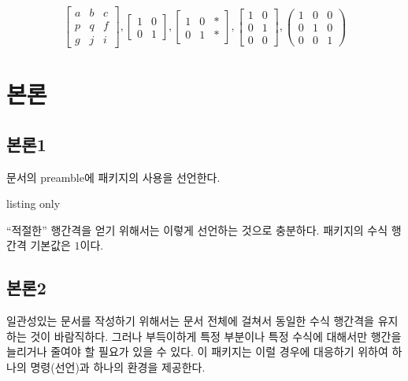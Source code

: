 \documentclass[a4paper,amsmath]{oblivoir}
\begin{document}
\begin{obMathLeading}
    \[
        \begin{bmatrix} a & b & c \\ p & q & f \\ g & j & i \end{bmatrix},
        \begin{bmatrix} 1 & 0 \\ 0 & 1\end{bmatrix},
        \begin{bmatrix} 1 & 0 & \ast\! \\ 0 & 1 & \ast\! \end{bmatrix},
        \begin{bmatrix} 1 & 0 \\ 0 & 1 \\ 0 & 0 \end{bmatrix},
        \begin{pmatrix} 1 & 0 & 0 \\ 0 & 1 & 0 \\ 0 & 0 & 1 \end{pmatrix}
    \]
\end{obMathLeading}

\section{본론}

\subsection{본론1}

문서의 preamble에 패키지의 사용을 선언한다.

\begin{tcblisting}{listing only}
    \usepackage{ob-mathleading}
\end{tcblisting}

``적절한'' 행간격을 얻기 위해서는 이렇게 선언하는 것으로 충분하다. 패키지의 수식 행간격 기본값은 $1$이다.

\subsection{본론2}

일관성있는 문서를 작성하기 위해서는 문서 전체에 걸쳐서 동일한 수식 행간격을 유지하는 것이 바람직하다. 
그러나 부득이하게 특정 부분이나 특정 수식에 대해서만 행간을 늘리거나 줄여야 할 필요가 있을 수 있다.
이 패키지는 이럴 경우에 대응하기 위하여 하나의 명령(선언)과 하나의 환경을 제공한다.
\end{document}
